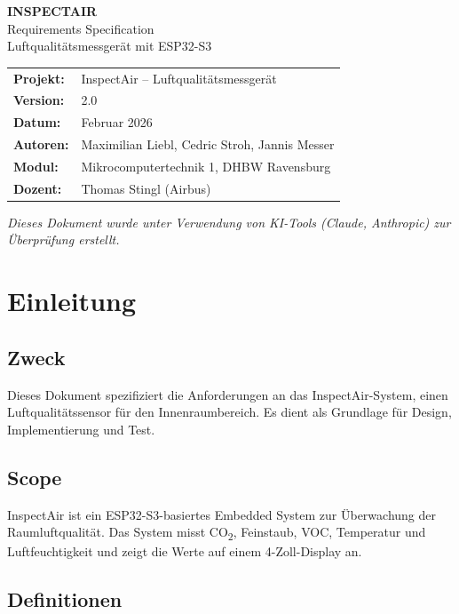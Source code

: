 \documentclass[a4paper,11pt]{article}
\begin{document}
\begin{center}
{\LARGE\textbf{INSPECTAIR}}\\[0.3cm]
{\Large Requirements Specification}\\[0.3cm]
{\large Luftqualitätsmessgerät mit ESP32-S3}\\[0.5cm]
\begin{tabular}{ll}
\textbf{Projekt:} & InspectAir -- Luftqualitätsmessgerät \\
\textbf{Version:} & 2.0 \\
\textbf{Datum:} & Februar 2026 \\
\textbf{Autoren:} & Maximilian Liebl, Cedric Stroh, Jannis Messer \\
\textbf{Modul:} & Mikrocomputertechnik 1, DHBW Ravensburg \\
\textbf{Dozent:} & Thomas Stingl (Airbus) \\
\end{tabular}
\end{center}

\vspace{0.5cm}
\noindent\textit{Dieses Dokument wurde unter Verwendung von KI-Tools (Claude, Anthropic) zur Überprüfung erstellt.}
\vspace{0.3cm}

\tableofcontents
\newpage

\section{Einleitung}

\subsection{Zweck}
Dieses Dokument spezifiziert die Anforderungen an das InspectAir-System, einen Luftqualitätssensor für den Innenraumbereich. Es dient als Grundlage für Design, Implementierung und Test.

\subsection{Scope}
InspectAir ist ein ESP32-S3-basiertes Embedded System zur Überwachung der Raumluftqualität. Das System misst CO\textsubscript{2}, Feinstaub, VOC, Temperatur und Luftfeuchtigkeit und zeigt die Werte auf einem 4-Zoll-Display an.

\subsection{Definitionen}
\end{document}
